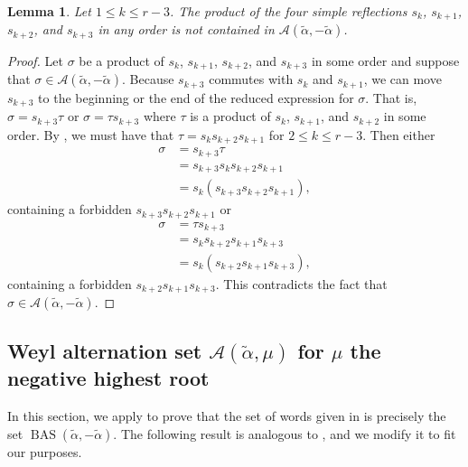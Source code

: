 \documentclass{amsart}
\newtheorem{lemma}[theorem]{Lemma}
\theoremstyle{definition}
\DeclareMathOperator{\BAS}{BAS}
\newcommand{\hroot}{\tilde{\alpha}}
\newcommand{\calA}{\mathcal{A}}
\begin{document}
\begin{lemma} \label{Highest:1234}
Let $1 \leq k \leq r-3$. The product of the four simple reflections $s_k$, $s_{k+1}$, $s_{k+2}$, and $s_{k+3}$ in any order is not contained in $\mathcal{A}(\hroot,-\hroot)$.    
\end{lemma}

\begin{proof}
Let $\sigma$ be a product of $s_k$, $s_{k+1}$, $s_{k+2}$, and $s_{k+3}$ in some order and suppose that $\sigma\in\mathcal{A}(\hroot,-\hroot)$. Because $s_{k+3}$ commutes with $s_k$ and $s_{k+1}$, we can move $s_{k+3}$ to the beginning or the end of the reduced expression for $\sigma$. That is, $\sigma=s_{k+3}\tau$ or $\sigma=\tau s_{k+3}$ where $\tau$ is a product of $s_k$, $s_{k+1}$, and $s_{k+2}$ in some order. By , we must have that $\tau=s_{k}s_{k+2}s_{k+1}$ for $2\leq k\leq r-3$. Then either \begin{align*}
    \sigma&=s_{k+3}\tau\\
    &=s_{k+3}s_{k}s_{k+2}s_{k+1}\\
    &=s_k(s_{k+3}s_{k+2}s_{k+1}),
\end{align*} containing a forbidden $s_{k+3}s_{k+2}s_{k+1}$ or \begin{align*}
    \sigma&=\tau s_{k+3}\\
    &=s_{k}s_{k+2}s_{k+1}s_{k+3}\\
    &=s_k(s_{k+2}s_{k+1}s_{k+3}),
\end{align*} containing a forbidden $s_{k+2}s_{k+1}s_{k+3}$. This contradicts the fact that $\sigma\in \mathcal{A}(\hroot,-\hroot)$.
\end{proof}

\subsection{Weyl alternation set \texorpdfstring{$\calA(\hroot,\mu)$}{A(alpha tilde,mu)} for \texorpdfstring{$\mu$}{mu} the negative highest root}\label{sec:BAS_for_negAlpha} In this section, we apply  to prove that the set of words given in  is precisely the set $\BAS(\tilde\alpha,-\tilde\alpha)$. The following result is analogous to \cite[Lemma 4.3]{Lauren}, and we modify it to fit our purposes.
\end{document}
